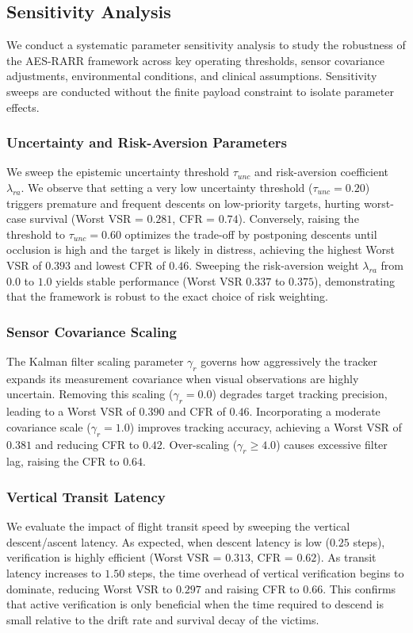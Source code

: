 \documentclass[runningheads]{llncs}
\newcommand{\aes}{AES-RARR}
\begin{document}
\subsection{Sensitivity Analysis}

We conduct a systematic parameter sensitivity analysis to study the robustness of the \aes{} framework across key operating thresholds, sensor covariance adjustments, environmental conditions, and clinical assumptions. Sensitivity sweeps are conducted without the finite payload constraint to isolate parameter effects.

\subsubsection{Uncertainty and Risk-Aversion Parameters}
We sweep the epistemic uncertainty threshold $\tau_{unc}$ and risk-aversion coefficient $\lambda_{ra}$. We observe that setting a very low uncertainty threshold ($\tau_{unc}=0.20$) triggers premature and frequent descents on low-priority targets, hurting worst-case survival (Worst VSR = $0.281$, CFR = $0.74$). Conversely, raising the threshold to $\tau_{unc}=0.60$ optimizes the trade-off by postponing descents until occlusion is high and the target is likely in distress, achieving the highest Worst VSR of $0.393$ and lowest CFR of $0.46$. Sweeping the risk-aversion weight $\lambda_{ra}$ from $0.0$ to $1.0$ yields stable performance (Worst VSR $0.337$ to $0.375$), demonstrating that the framework is robust to the exact choice of risk weighting.

\subsubsection{Sensor Covariance Scaling}
The Kalman filter scaling parameter $\gamma_r$ governs how aggressively the tracker expands its measurement covariance when visual observations are highly uncertain. Removing this scaling ($\gamma_r = 0.0$) degrades target tracking precision, leading to a Worst VSR of $0.390$ and CFR of $0.46$. Incorporating a moderate covariance scale ($\gamma_r = 1.0$) improves tracking accuracy, achieving a Worst VSR of $0.381$ and reducing CFR to $0.42$. Over-scaling ($\gamma_r \ge 4.0$) causes excessive filter lag, raising the CFR to $0.64$.

\subsubsection{Vertical Transit Latency}
We evaluate the impact of flight transit speed by sweeping the vertical descent/ascent latency. As expected, when descent latency is low ($0.25$ steps), verification is highly efficient (Worst VSR = $0.313$, CFR = $0.62$). As transit latency increases to $1.50$ steps, the time overhead of vertical verification begins to dominate, reducing Worst VSR to $0.297$ and raising CFR to $0.66$. This confirms that active verification is only beneficial when the time required to descend is small relative to the drift rate and survival decay of the victims.
\end{document}
